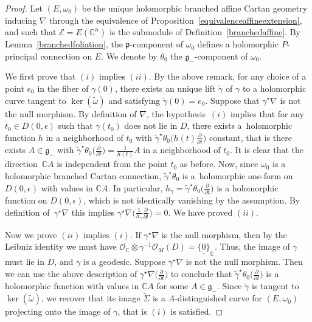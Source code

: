 \documentclass[pdftex]{sigma}
\newcommand{\der}[2]{\frac{\partial #1}{\partial#2}}
\numberwithin{equation}{section}
\begin{document}
\begin{proof} Let $(E,\omega_0)$ be the unique holomorphic branched affine Cartan geometry inducing $\nabla$ through the equivalence of Proposition~\ref{equivalenceaffineextension}, and such that $\mathcal{E}=E(\mathbb{C}^n)$ is the submodule of Definition~\ref{branchedaffine}. By Lemma~\ref{branchedfoliation}, the $\mathfrak{p}$-component of $\omega_0$ defines a holomorphic $P$-principal connection on $E$. We denote by $\theta_0$ the $\mathfrak{g}_-$-component of $\omega_0$.

 We first prove that $(i)$ implies $(ii)$. By the above remark, for any choice of a point $e_0$ in the fiber of $\gamma(0)$, there exists an unique lift $\tilde{\gamma}$ of $\gamma$ to a holomorphic curve tangent to $\ker(\tilde{\omega})$ and satisfying $\tilde{\gamma}(0)=e_0$. Suppose that $\gamma^\star \nabla$ is not the null morphism. By definition of $\nabla$, the hypothesis~$(i)$ implies that for any $t_0 \in D(0,\epsilon)$ such that $\gamma(t_0)$ does not lie in $D$, there exists a~holomorphic function $h$ in a neighborhood of $t_0$ with $\tilde{\gamma}^\star \theta_0 \big(h(t)\der{}{t}\big)$ constant, that is there exists $A\in \mathfrak{g}_-$ with $\tilde{\gamma}^\star \theta_0\big(\der{}{t}\big) = \frac{1}{h(t)} A$ in a neighborhood of $t_0$. It is clear that the direction~$\mathbb{C}A$ is independent from the point $t_0$ as before. Now, since $\omega_0$ is a holomorphic branched Cartan connection, $\tilde{\gamma}^\star \theta_0$ is a~holomorphic one-form on $D(0,\epsilon)$ with values in $\mathbb{C}A$. In particular, $h_\gamma= \tilde{\gamma}^\star \theta_0\big(\der{}{t}\big)$ is a holomorphic function on $D(0,\epsilon)$, which is not identically vanishing by the assumption. By definition of~$\gamma^\star \nabla$ this implies $\gamma^\star \nabla\big(\frac{1}{h_\gamma}\der{}{t}\big)=0$. We have proved $(ii)$.



Now we prove $(ii)$ implies $(i)$. If $\gamma^\star \nabla$ is the null morphism, then by the Leibniz identity we must have $\mathcal{O}_\mathbb{C} \otimes \gamma^{-1} \mathcal{O}_{M}(D) = \underline{\{0\}}_{\mathbb{C}}$. Thus, the image of $\gamma$ must lie in $D$, and $\gamma$ is a geodesic. Suppose $\gamma^\star \nabla$ is not the null morphism. Then we can use the above description of $\gamma^\star \nabla\big(\der{}{t}\big)$ to conclude that $\tilde{\gamma}^\star \theta_0\big(\der{}{t}\big)$ is a holomorphic function with values in $\mathbb{C}A$ for some $A\in \mathfrak{g}_-$. Since $\tilde{\gamma}$ is tangent to $\ker(\tilde{\omega})$, we recover that its image $\tilde{\Sigma}$ is a $A$-distinguished curve for $(E,\omega_0)$ projecting onto the image of $\gamma$, that is $(i)$ is satisfied.
\end{proof}
\end{document}
